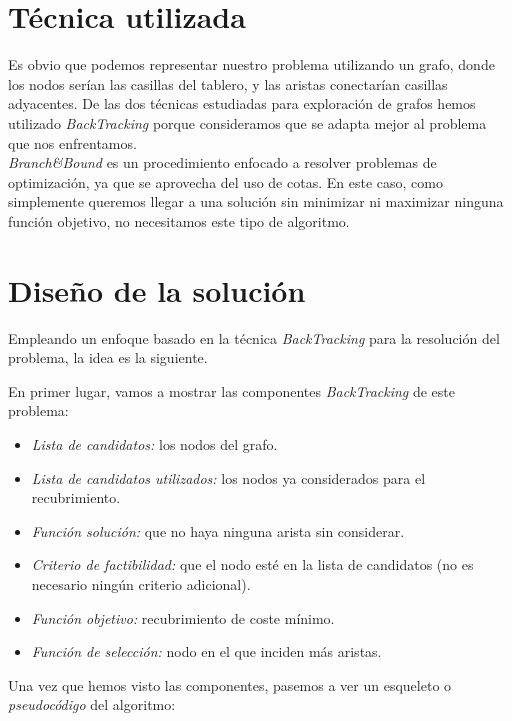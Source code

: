 \documentclass[11pt]{article}
\begin{document}
\section*{Técnica utilizada}

Es obvio que podemos representar nuestro problema utilizando un grafo, donde los nodos serían las casillas del tablero, y las aristas conectarían casillas adyacentes. De las dos técnicas estudiadas para exploración de grafos hemos utilizado \textit{BackTracking} porque consideramos que se adapta mejor al problema que nos enfrentamos.\\

\textit{Branch\&Bound} es un procedimiento enfocado a resolver problemas de optimización, ya que se aprovecha del uso de cotas. En este caso, como simplemente queremos llegar a una solución sin minimizar ni maximizar ninguna función objetivo, no necesitamos este tipo de algoritmo.


\section*{Diseño de la solución}

Empleando un enfoque basado en la técnica \textit{BackTracking} para la resolución del problema, la idea es la siguiente. %

En primer lugar, vamos a mostrar las componentes \textit{BackTracking} de este problema:

\begin{itemize}
	\item \textit{Lista de candidatos:} los nodos del grafo.
	\item \textit{Lista de candidatos utilizados:} los nodos ya considerados para el recubrimiento.
	\item \textit{Función solución:} que no haya ninguna arista sin considerar.
	\item \textit{Criterio de factibilidad:} que el nodo esté en la lista de candidatos (no es necesario ningún criterio adicional).
	\item \textit{Función objetivo:} recubrimiento de coste mínimo.
	\item \textit{Función de selección:} nodo en el que inciden más aristas.
\end{itemize}

Una vez que hemos visto las componentes, pasemos a ver un esqueleto o \textit{pseudocódigo} del algoritmo: \\
\end{document}
